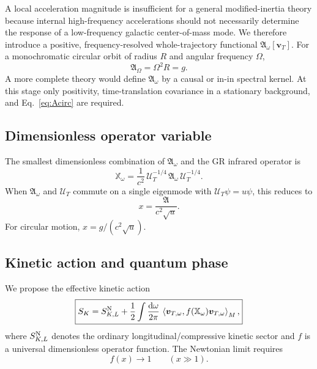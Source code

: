 \documentclass[11pt]{article}
\newcommand{\UT}{\mathcal{U}_{T}}
\newcommand{\Arel}{\mathfrak{A}}
\newcommand{\Xop}{\mathbb{X}}
\newcommand{\vT}{\bm{v}_{T}}
\newcommand{\avg}[1]{\left\langle #1\right\rangle}
\begin{document}
A local acceleration magnitude is insufficient for a general modified-inertia theory because internal high-frequency accelerations should not necessarily determine the response of a low-frequency galactic center-of-mass mode. We therefore introduce a positive, frequency-resolved whole-trajectory functional $\Arel_\omega[\vT]$. For a monochromatic circular orbit of radius $R$ and angular frequency $\Omega$,
\begin{equation}
    \boxed{\Arel_\Omega=\Omega^2R=g.}
    \label{eq:Acirc}
\end{equation}
A more complete theory would define $\Arel_\omega$ by a causal or in-in spectral kernel. At this stage only positivity, time-translation covariance in a stationary background, and Eq.~\eqref{eq:Acirc} are required.

\subsection{Dimensionless operator variable}

The smallest dimensionless combination of $\Arel_\omega$ and the GR infrared operator is
\begin{equation}
    \boxed{
    \Xop_\omega
    =\frac{1}{c^2}\,
    \UT^{-1/4}\,\Arel_\omega\,\UT^{-1/4}.
    }
    \label{eq:Xoperator}
\end{equation}
When $\Arel_\omega$ and $\UT$ commute on a single eigenmode with $\UT\psi=u\psi$, this reduces to
\begin{equation}
    x=\frac{\Arel}{c^2\sqrt{u}}.
    \label{eq:xscalar}
\end{equation}
For circular motion, $x=g/(c^2\sqrt{u})$.

\subsection{Kinetic action and quantum phase}

We propose the effective kinetic action
\begin{equation}
    \boxed{
    S_K=S_{K,L}^{\rm N}
    +\frac12\int\frac{\dd\omega}{2\pi}\,
    \avg{
    \bm v_{T,\omega},
    f(\Xop_\omega)\bm v_{T,\omega}
    }_M,
    }
    \label{eq:SK}
\end{equation}
where $S_{K,L}^{\rm N}$ denotes the ordinary longitudinal/compressive kinetic sector and $f$ is a universal dimensionless operator function. The Newtonian limit requires
\begin{equation}
    f(x)\to 1\qquad (x\gg 1).
    \label{eq:fNewton}
\end{equation}
\end{document}
